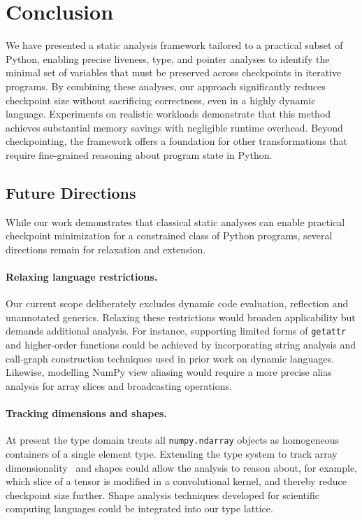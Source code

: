 \section{Conclusion}
\label{sec:conclusion}

We have presented a static analysis framework tailored to a practical subset of Python, enabling precise liveness, type, and pointer analyses to identify the minimal set of variables that must be preserved across checkpoints in iterative programs. By combining these analyses, our approach significantly reduces checkpoint size without sacrificing correctness, even in a highly dynamic language. Experiments on realistic workloads demonstrate that this method achieves substantial memory savings with negligible runtime overhead. Beyond checkpointing, the framework offers a foundation for other transformations that require fine-grained reasoning about program state in Python.

\subsection{Future Directions}

While our work demonstrates that classical static analyses can enable practical checkpoint minimization for a constrained class of Python programs, several directions remain for relaxation and extension.

\paragraph{Relaxing language restrictions.} Our current scope deliberately excludes dynamic code evaluation, reflection and unannotated generics. Relaxing these restrictions would broaden applicability but demands additional analysis. For instance, supporting limited forms of \texttt{getattr} and higher‑order functions could be achieved by incorporating string analysis and call‑graph construction techniques used in prior work on dynamic languages. Likewise, modelling NumPy view aliasing would require a more precise alias analysis for array slices and broadcasting operations.

\paragraph{Tracking dimensions and shapes.} At present the type domain treats all \texttt{numpy.ndarray} objects as homogeneous containers of a single element type. Extending the type system to track array dimensionality~\cite{liu2020type} and shapes could allow the analysis to reason about, for example, which slice of a tensor is modified in a convolutional kernel, and thereby reduce checkpoint size further. Shape analysis techniques developed for scientific computing languages could be integrated into our type lattice.

